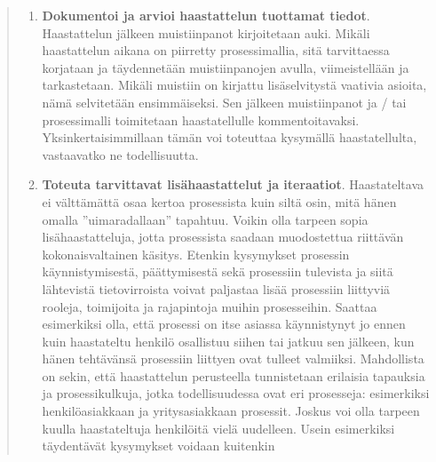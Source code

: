 \documentclass[
  finnish,
  letterpaper,
  DIV=11,
  numbers=noendperiod,
  oneside]{scrreprt}
\begin{document}
\begin{quote}
\begin{enumerate}
  korjata mahdolliset väärinymmärrykset. Samoin mallin kautta
  haastateltavan mieleen voi nousta asioita, joita hän ei ole vielä
  huomannut mainita. Lisäksi prosessimalli auttaa pitämään keskustelun
  tarkkuustason johdonmukaisena ja tavoitetta vastaavana. Vaiheittain
  rakentuvasta graafisesta mallista on helpompi huomata, mikäli
  keskustelu uhkaa ajautua tarpeettomiin yksityiskohtiin tai toisaalta
  liikkuu tavoitteisiin nähden liian yleisellä tasolla. Haastattelun
  aikana piirrettävä prosessimalli kannattaa kuitenkin pitää
  notaatioltaan yksinkertaisena. Useimpiin tilanteisiin riittävät BPMN:n
  peruselementit tai esimerkiksi vuokaaviomalli. Lopputulos haastattelun
  päättyessä on tavallisesti yleisellä tasolla esitetty prosessikulku,
  jota on höystetty joukolla yksityiskohtiin, poikkeuksiin ja tarkennus-
  tai selvitystarpeisiin liittyviä annotaatioita tai muistilappuja.
\item
  \textbf{Dokumentoi ja arvioi haastattelun tuottamat tiedot}.
  Haastattelun jälkeen muistiinpanot kirjoitetaan auki. Mikäli
  haastattelun aikana on piirretty prosessimallia, sitä tarvittaessa
  korjataan ja täydennetään muistiinpanojen avulla, viimeistellään ja
  tarkastetaan. Mikäli muistiin on kirjattu lisäselvitystä vaativia
  asioita, nämä selvitetään ensimmäiseksi. Sen jälkeen muistiinpanot ja
  / tai prosessimalli toimitetaan haastatellulle kommentoitavaksi.
  Yksinkertaisimmillaan tämän voi toteuttaa kysymällä haastatellulta,
  vastaavatko ne todellisuutta.
\item
  \textbf{Toteuta tarvittavat lisähaastattelut ja iteraatiot}.
  Haastateltava ei välttämättä osaa kertoa prosessista kuin siltä osin,
  mitä hänen omalla ''uimaradallaan'' tapahtuu. Voikin olla tarpeen
  sopia lisähaastatteluja, jotta prosessista saadaan muodostettua
  riittävän kokonaisvaltainen käsitys. Etenkin kysymykset prosessin
  käynnistymisestä, päättymisestä sekä prosessiin tulevista ja siitä
  lähtevistä tietovirroista voivat paljastaa lisää prosessiin liittyviä
  rooleja, toimijoita ja rajapintoja muihin prosesseihin. Saattaa
  esimerkiksi olla, että prosessi on itse asiassa käynnistynyt jo ennen
  kuin haastateltu henkilö osallistuu siihen tai jatkuu sen jälkeen, kun
  hänen tehtävänsä prosessiin liittyen ovat tulleet valmiiksi.
  Mahdollista on sekin, että haastattelun perusteella tunnistetaan
  erilaisia tapauksia ja prosessikulkuja, jotka todellisuudessa ovat eri
  prosesseja: esimerkiksi henkilöasiakkaan ja yritysasiakkaan prosessit.
  Joskus voi olla tarpeen kuulla haastateltuja henkilöitä vielä
  uudelleen. Usein esimerkiksi täydentävät kysymykset voidaan kuitenkin

\end{enumerate}
\end{quote}
\end{document}
